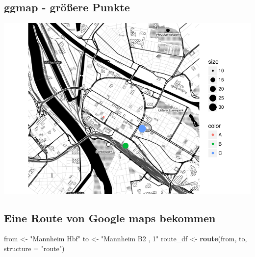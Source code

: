 \documentclass[]{article}
\newenvironment{Shaded}{\begin{snugshade}}{\end{snugshade}}
\newcommand{\KeywordTok}[1]{\textcolor[rgb]{0.13,0.29,0.53}{\textbf{{#1}}}}
\newcommand{\DataTypeTok}[1]{\textcolor[rgb]{0.13,0.29,0.53}{{#1}}}
\newcommand{\DecValTok}[1]{\textcolor[rgb]{0.00,0.00,0.81}{{#1}}}
\newcommand{\StringTok}[1]{\textcolor[rgb]{0.31,0.60,0.02}{{#1}}}
\newcommand{\NormalTok}[1]{{#1}}
\begin{document}
\subsection{ggmap - größere Punkte}\label{ggmap---groere-punkte}

\begin{Shaded}
\end{Shaded}

\includegraphics{Intro_Datenanalyse1_files/figure-latex/unnamed-chunk-269-1.pdf}

\subsection{Eine Route von Google maps
bekommen}\label{eine-route-von-google-maps-bekommen}

\begin{Shaded}
\begin{Highlighting}[]
\NormalTok{from <-}\StringTok{ "Mannheim Hbf"}
\NormalTok{to <-}\StringTok{ "Mannheim B2 , 1"}
\NormalTok{route_df <-}\StringTok{ }\KeywordTok{route}\NormalTok{(from, to, }\DataTypeTok{structure =} \StringTok{"route"}\NormalTok{)}
\end{Highlighting}
\end{Shaded}
\end{document}
